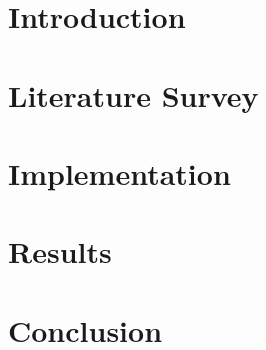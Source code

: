 \documentclass[a4paper, 12pt, oneside, BCOR1cm,toc=chapterentrywithdots]{scrbook}
\begin{document}
\chapter{Introduction}

\chapter{Literature Survey}


\chapter{Implementation}


\chapter{Results}


\chapter{Conclusion}







\end{document}
